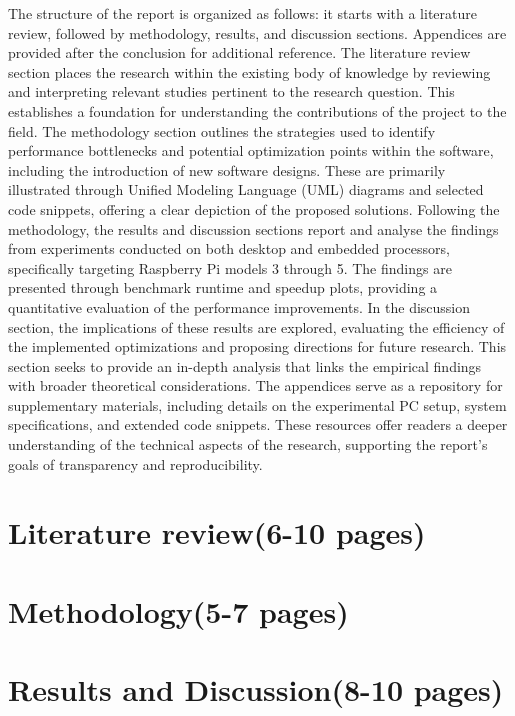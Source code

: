 \documentclass[12pt, openany]{book}
\begin{document}
The structure of the report is organized as follows: it starts with a literature review, followed by methodology, results, and discussion sections. Appendices are provided after the conclusion for additional reference. The literature review section places the research within the existing body of knowledge by reviewing and interpreting relevant studies pertinent to the research question. This establishes a foundation for understanding the contributions of the project to the field. The methodology section outlines the strategies used to identify performance bottlenecks and potential optimization points within the software, including the introduction of new software designs. These are primarily illustrated through Unified Modeling Language (UML) diagrams and selected code snippets, offering a clear depiction of the proposed solutions. Following the methodology, the results and discussion sections report and analyse the findings from experiments conducted on both desktop and embedded processors, specifically targeting Raspberry Pi models 3 through 5. The findings are presented through benchmark runtime and speedup plots, providing a quantitative evaluation of the performance improvements. In the discussion section, the implications of these results are explored, evaluating the efficiency of the implemented optimizations and proposing directions for future research. This section seeks to provide an in-depth analysis that links the empirical findings with broader theoretical considerations. The appendices serve as a repository for supplementary materials, including details on the experimental PC setup, system specifications, and extended code snippets. These resources offer readers a deeper understanding of the technical aspects of the research, supporting the report's goals of transparency and reproducibility. 


\chapter{Literature review(6-10 pages)}



\chapter{Methodology(5-7 pages)}


\chapter{Results and Discussion(8-10 pages)}

\end{document}
